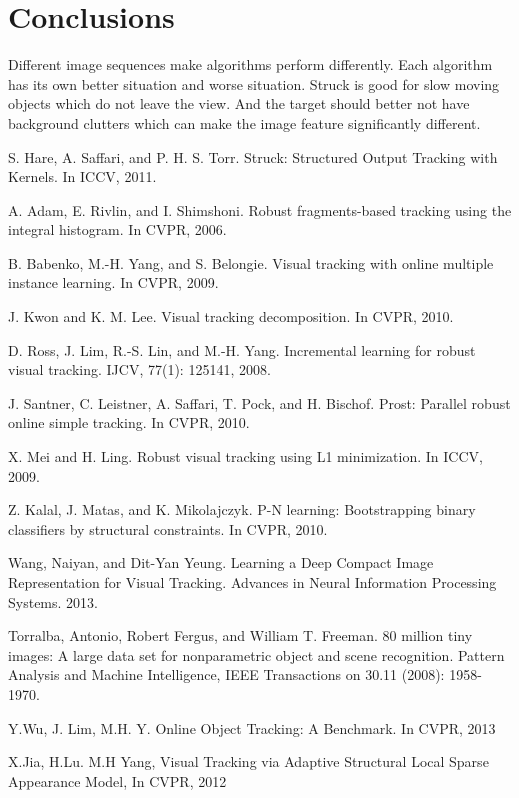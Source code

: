 \documentclass{acm_proc_article-sp}
\begin{document}
\section{Conclusions}
Different image sequences make algorithms perform differently.
Each algorithm has its own better situation and worse situation.
Struck is good for slow moving objects which do not leave the view. And the target should better not have background clutters which can make the image feature significantly different.


\begin{thebibliography}{99}
S. Hare, A. Saffari, and P. H. S. Torr. Struck: Structured Output Tracking with Kernels. In ICCV, 2011.

A. Adam, E. Rivlin, and I. Shimshoni. Robust fragments-based tracking using the integral histogram. In CVPR, 2006.

B. Babenko, M.-H. Yang, and S. Belongie. Visual tracking with online multiple instance learning. In CVPR, 2009.

J. Kwon and K. M. Lee. Visual tracking decomposition. In CVPR, 2010.

D. Ross, J. Lim, R.-S. Lin, and M.-H. Yang. Incremental learning for robust visual tracking. IJCV, 77(1): 125141, 2008.

J. Santner, C. Leistner, A. Saffari, T. Pock, and H. Bischof. Prost: Parallel robust online simple tracking. In CVPR, 2010.

X. Mei and H. Ling. Robust visual tracking using L1 minimization. In ICCV, 2009.

Z. Kalal, J. Matas, and K. Mikolajczyk. P-N learning: Bootstrapping binary classifiers by structural constraints. In CVPR, 2010.

Wang, Naiyan, and Dit-Yan Yeung. Learning a Deep Compact Image Representation for Visual Tracking. Advances in Neural Information Processing Systems. 2013.

Torralba, Antonio, Robert Fergus, and William T. Freeman. 80 million tiny images: A large data set for nonparametric object and scene recognition. Pattern Analysis and Machine Intelligence, IEEE Transactions on 30.11 (2008): 1958-1970.

Y.Wu, J. Lim, M.H. Y. Online Object Tracking: A Benchmark. In CVPR, 2013

X.Jia, H.Lu. M.H Yang, Visual Tracking via Adaptive Structural Local Sparse Appearance Model, In CVPR, 2012


\end{thebibliography}
\end{document}
